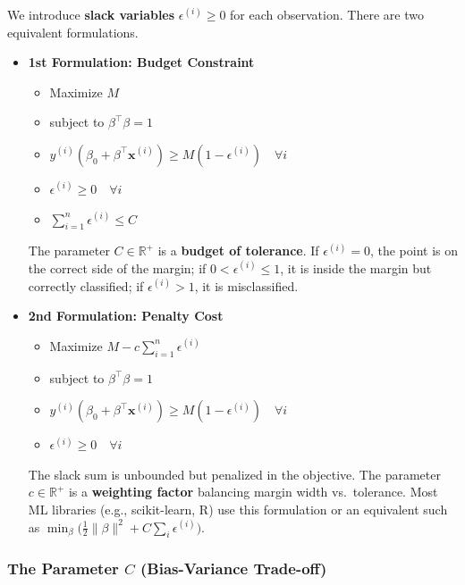 We introduce \textbf{slack variables} $\epsilon^{(i)} \geq 0$ for each observation. There are two equivalent formulations.

\begin{definitionblock}
    
\begin{itemize}
\item \textbf{1st Formulation: Budget Constraint}

    \begin{itemize}
        \item Maximize $M$
        \item subject to $\beta^\top \beta = 1$
        \item $y^{(i)}(\beta_0 + \beta^\top \bm{x}^{(i)}) \geq M(1 - \epsilon^{(i)}) \quad \forall i$
        \item $\epsilon^{(i)} \geq 0 \quad \forall i$
        \item $\sum_{i=1}^{n} \epsilon^{(i)} \le C$
    \end{itemize}
    The parameter $C \in \mathbb{R}^+$ is a \textbf{budget of tolerance}. If $\epsilon^{(i)} = 0$, the point is on the correct side of the margin; if $0 < \epsilon^{(i)} \le 1$, it is inside the margin but correctly classified; if $\epsilon^{(i)} > 1$, it is misclassified.
    
\item\textbf{2nd Formulation: Penalty Cost}

    \begin{itemize}
        \item Maximize $M - c \sum_{i=1}^{n} \epsilon^{(i)}$
        \item subject to $\beta^\top \beta = 1$
        \item $y^{(i)}(\beta_0 + \beta^\top \bm{x}^{(i)}) \geq M(1 - \epsilon^{(i)}) \quad \forall i$
        \item $\epsilon^{(i)} \geq 0 \quad \forall i$
    \end{itemize}
    The slack sum is unbounded but penalized in the objective. The parameter $c \in \mathbb{R}^+$ is a \textbf{weighting factor} balancing margin width vs.\ tolerance. Most ML libraries (e.g., scikit-learn, R) use this formulation or an equivalent such as $\min_{\beta} \bigl( \frac{1}{2}\|\beta\|^2 + C \sum_i \epsilon^{(i)} \bigr)$.
\end{itemize}
\end{definitionblock}

\subsubsection{The Parameter $C$ (Bias-Variance Trade-off)}

